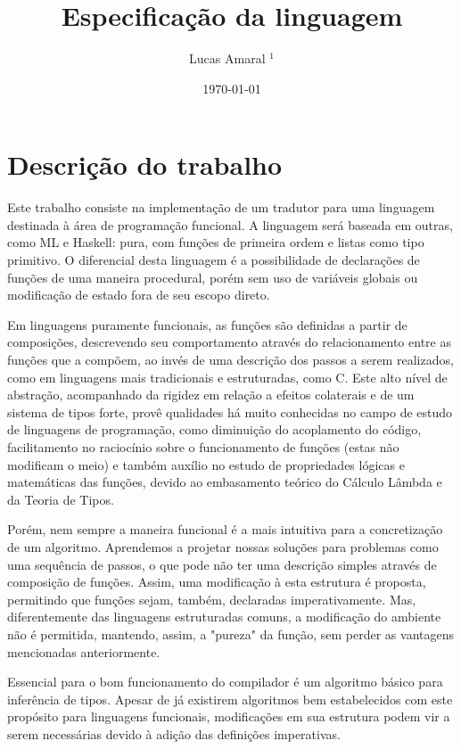 \documentclass[11pt]{article}
\title{Especificação da linguagem}
\author{Lucas Amaral $^1$}
\date{\today}
\begin{document}
\maketitle


\section{Descrição do trabalho}
Este trabalho consiste na implementação de um tradutor para uma linguagem destinada à 
área de programação funcional.
A linguagem será baseada em outras, como ML e Haskell:
pura, com funções de primeira ordem e listas como tipo primitivo.
O diferencial desta linguagem é a possibilidade de declarações de funções de uma maneira procedural,
porém sem uso de variáveis globais ou modificação de estado fora de seu escopo direto.

Em linguagens puramente funcionais, as funções são definidas a partir de composições, descrevendo 
seu comportamento através do relacionamento entre as funções que a compõem,
ao invés de uma descrição dos passos a serem realizados, como em linguagens mais tradicionais e
estruturadas, como C.
Este alto nível de abstração, acompanhado da rigidez em relação a efeitos colaterais e 
de um sistema de tipos forte,
provê qualidades há muito conhecidas no campo de estudo de linguagens de programação, 
como diminuição do acoplamento do código, 
facilitamento no raciocínio sobre o funcionamento de funções (estas não modificam o meio) 
e também auxílio no estudo de propriedades lógicas e matemáticas das funções, 
devido ao embasamento teórico do Cálculo Lâmbda e da Teoria de Tipos.

Porém, nem sempre a maneira funcional é a mais intuitiva para a concretização de um algoritmo.
Aprendemos a projetar nossas soluções para problemas como uma sequência de passos,
o que pode não ter uma descrição simples através de composição de funções. 
Assim, uma modificação à esta estrutura é proposta, permitindo que funções sejam, também, declaradas
imperativamente. Mas, diferentemente das linguagens estruturadas comuns, 
a modificação do ambiente não é permitida, mantendo, assim, a "pureza" da função,
sem perder as vantagens mencionadas anteriormente.

Essencial para o bom funcionamento do compilador é um algoritmo básico para inferência de tipos.
Apesar de já existirem algoritmos bem estabelecidos com este propósito 
para linguagens funcionais, modificações em sua estrutura podem vir a serem necessárias devido 
à adição das definições imperativas.
\end{document}
